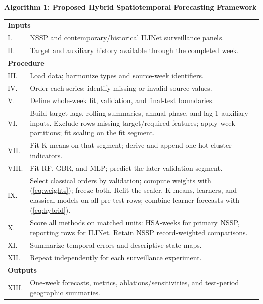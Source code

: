 \par\noindent\begin{minipage}{\columnwidth}
\centering\textbf{Algorithm 1: Proposed Hybrid Spatiotemporal Forecasting Framework}\par\smallskip
\centering\footnotesize
\begin{tabularx}{\columnwidth}{@{}lX@{}}
\toprule
\multicolumn{2}{l}{\textbf{Inputs}}\\
I. & NSSP and contemporary/historical ILINet surveillance panels.\\
II. & Target and auxiliary history available through the completed week.\\
\midrule
\multicolumn{2}{l}{\textbf{Procedure}}\\
III. & Load data; harmonize types and source-week identifiers.\\
IV. & Order each series; identify missing or invalid source values.\\
V. & Define whole-week fit, validation, and final-test boundaries.\\
VI. & Build target lags, rolling summaries, annual phase, and lag-1 auxiliary inputs. Exclude rows missing target/required features; apply week partitions; fit scaling on the fit segment.\\
VII. & Fit K-means on that segment; derive and append one-hot cluster indicators.\\
VIII. & Fit RF, GBR, and MLP; predict the later validation segment.\\
IX. & Select classical orders by validation; compute weights with (\ref{eq:weights}); freeze both. Refit the scaler, K-means, learners, and classical models on all pre-test rows; combine learner forecasts with (\ref{eq:hybrid}).\\
X. & Score all methods on matched units: HSA-weeks for primary NSSP, reporting rows for ILINet. Retain NSSP record-weighted comparisons.\\
XI. & Summarize temporal errors and descriptive state maps.\\
XII. & Repeat independently for each surveillance experiment.\\
\midrule
\multicolumn{2}{l}{\textbf{Outputs}}\\
XIII. & One-week forecasts, metrics, ablations/sensitivities, and test-period geographic summaries.\\
\bottomrule
\end{tabularx}
\end{minipage}
\par\smallskip
